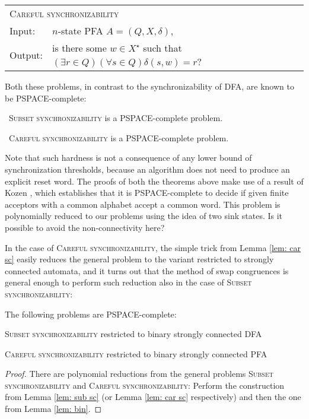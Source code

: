 \documentclass{ws-ijmpc}
\newcommand{\noun}[1]{\textsc{#1}}
\providecommand{\tabularnewline}{\\}
\begin{document}
\begin{flushleft}
\begin{tabular}{ll}
\multicolumn{2}{l}{\noun{Careful synchronizability}}\tabularnewline
Input: & $n$-state PFA $A=\left(Q,X,\delta\right)$,\tabularnewline
Output: & is there some $w\in X^{\star}$ such that $\left(\exists r\in Q\right)\left(\forall s\in Q\right)\delta\!\left(s,w\right)=r$?\tabularnewline
\end{tabular}
\par\end{flushleft}

Both these problems, in contrast to the synchronizability of DFA,
are known to be PSPACE-complete:
\begin{theorem}
\emph{\cite{NAT1,SAN1short}}\noun{~Subset synchronizability} is
a PSPACE-complete problem.
\end{theorem}

\begin{theorem}
\emph{\cite{MAR4}}\noun{~Careful synchronizability} is a PSPACE-complete
problem.
\end{theorem}
Note that such hardness is not a consequence of any lower bound of
synchronization thresholds, because an algorithm does not need to
produce an explicit reset word. The proofs of both the theorems above
make use of a result of Kozen \citep{KOZ1}, which establishes that
it is PSPACE-complete to decide if given finite acceptors with a common
alphabet accept a common word. This problem is polynomially reduced
to our problems\noun{ }using the idea of two sink states. Is it possible
to avoid the non-connectivity here? 

In the case of \noun{Careful synchronizability}, the simple trick
from Lemma \ref{lem: car sc} easily reduces the general problem to
the variant restricted to strongly connected automata, and it turns
out that the method of swap congruences is general enough to perform
such reduction also in the case of \noun{Subset synchronizability:}
\begin{theorem}
The following problems are PSPACE-complete:\end{theorem}
\begin{romanlist}
\item \noun{Subset synchronizability }restricted to binary strongly connected
DFA 
\item \noun{Careful synchronizability }restricted to binary strongly connected
PFA \end{romanlist}
\begin{proof}
There are polynomial reductions from the general problems \noun{Subset
synchronizability} and \noun{Careful synchronizability}: Perform the
construction from Lemma \ref{lem: sub sc} (or Lemma \ref{lem: car sc}
respectively) and then the one from Lemma \ref{lem: bin}.
\end{proof}
\end{document}
